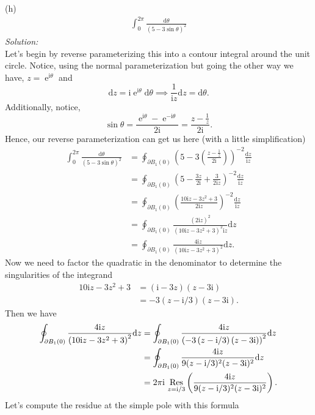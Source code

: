 \documentclass[10pt]{amsart}
\newcommand{\D}{\mathrm{d}}
\newcommand{\I}{\mathrm{i}}
\DeclareMathOperator{\E}{e}
\theoremstyle{nonumberplain}
\begin{document}
\begin{enumerate}[label={\bf {\arabic*}:}]
\noindent
(h) \\
\begin{align*}
\int_{0}^{2 \pi} \frac {\D \theta}{ (5 - 3\sin\theta)^2 }
\end{align*}
\textit{Solution:} \\
Let's begin by reverse parameterizing this into a contour integral around the unit circle.
Notice, using the normal parameterization but going the other way we have, $z = \E^{\I \theta}$ and
$$ \D z = \I \E^{\I \theta } \D \theta \implies \frac 1 {\I z} \D z = \D \theta. $$
Additionally, notice,
$$
\sin\theta = \frac {\E^{\I \theta} - \E^{-\I \theta}}{2 \I} = \frac {z - \frac 1 z}{2 \I}.
$$
Hence, our reverse parameterization can get us here (with a little simplification)
\begin{align*}
\int_{0}^{2 \pi} \frac {\D \theta}{ (5 - 3\sin\theta)^2 }
	&= \oint_{\partial B_1(0)} \left(5 - 3 \left( \frac {z - \frac 1 z}{2 \I} \right) \right)^{-2} \frac {\D z}{ \I z } \\
	&= \oint_{\partial B_1(0)} \left(5 - \frac {3z}{2 \I} + \frac 3 {2 \I z} \right)^{-2} \frac {\D z}{ \I z } \\
	&= \oint_{\partial B_1(0)} \left(\frac {10 \I z - 3z^2 + 3}{2 \I z}\right)^{-2} \frac {\D z}{ \I z } \\
	&= \oint_{\partial B_1(0)} \frac {(2 \I z)^2} {\left(10 \I z - 3z^2 + 3\right)^{2}\I z} \D z \\
	&= \oint_{\partial B_1(0)} \frac {4 \I z} {\left(10 \I z - 3z^2 + 3\right)^{2}} \D z.
\end{align*}
Now we need to factor the quadratic in the denominator to determine the singularities of the integrand
\begin{align*}
10 \I z - 3z^2 + 3
	&= (\I - 3 z)(z - 3 \I) \\
	&= - 3 \left(z - \I / 3 \right) \left(z - 3 \I \right).
\end{align*}
Then we have
\begin{align*}
\oint_{\partial B_1(0)} \frac {4 \I z} {\left(10 \I z - 3z^2 + 3\right)^{2}} \D z
	&= \oint_{\partial B_1(0)} \frac {4 \I z} {\left(- 3 \left(z - \I / 3 \right) \left(z - 3 \I \right)\right)^{2}} \D z \\
	&= \oint_{\partial B_1(0)} \frac {4 \I z} {9 (z - \I / 3 )^2 (z - 3 \I )^2} \D z \\
	&= 2 \pi \I \, \, \underset{z = \I/3 }{ \rm Res } \left( \frac {4 \I z} {9 (z - \I / 3 )^2 (z - 3 \I )^2} \right).
\end{align*}
Let's compute the residue at the simple pole with this formula

\end{enumerate}
\end{document}

